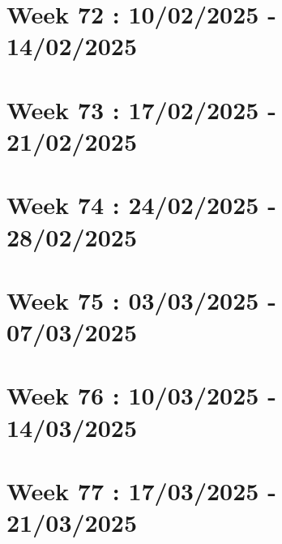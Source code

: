 \documentclass[french]{article}
\begin{document}
	\section{Week 72 : 10/02/2025 - 14/02/2025}

	\section{Week 73 : 17/02/2025 - 21/02/2025}

	\section{Week 74 : 24/02/2025 - 28/02/2025}

	\section{Week 75 : 03/03/2025 - 07/03/2025}

	\section{Week 76 : 10/03/2025 - 14/03/2025}

	\section{Week 77 : 17/03/2025 - 21/03/2025}
\end{document}
